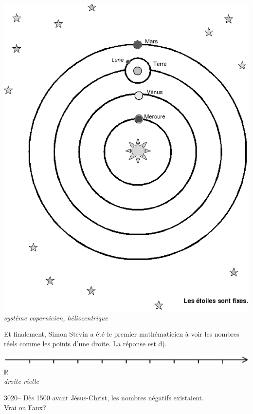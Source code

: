 \documentclass[letterpaper, 12pt]{article}
\begin{document}
\begin{center}
\includegraphics[scale=0.25]{heliocentrique.eps}\\
\emph{{\small syst\`eme copernicien, h\'eliocentrique}}
\end{center}

Et finalement, Simon Stevin a \'et\'e le premier math\'ematicien \`a voir les nombres r\'eels comme les points d'une droite. La r\'eponse est d).\\
\begin{center}
\includegraphics[scale=0.25]{droitereelle.eps} {\large$\mathbb{R}$}\\
\emph{{\small droite r\'eelle}}
\end{center}



3020-- D\`es 1500 avant J\'esus-Christ, les nombres n\'egatifs existaient.\\
Vrai ou Faux?\\
\end{document}
